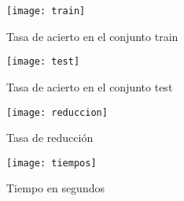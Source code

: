 \documentclass[12pt]{article}
\begin{document}
\begin{figure}[H]
\centering
\texttt{[image: train]}
\caption{Tasa de acierto en el conjunto train} \label{fig:train}
\end{figure}

\begin{figure}[H]
\centering
\texttt{[image: test]}
\caption{Tasa de acierto en el conjunto test} \label{fig:test}
\end{figure}

\begin{figure}[H]
\centering
\texttt{[image: reduccion]}
\caption{Tasa de reducción} \label{fig:reduccion}
\end{figure}

\begin{figure}[H]
\centering
\texttt{[image: tiempos]}
\caption{Tiempo en segundos} \label{fig:tiempos}
\end{figure}
\end{document}

